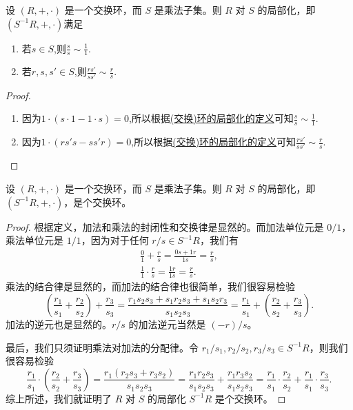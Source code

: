 \documentclass[../../main.tex]{subfiles}
\begin{document}
\begin{proposition}[(交换)环的局部化的基本性质]\label{proposition:(交换)环的局部化的基本性质}
设 $(R, +, \cdot)$ 是一个交换环，而 $S$ 是乘法子集。则 $R$ 对 $S$ 的局部化，即 $(S^{-1}R, +, \cdot)$满足
\begin{enumerate}[(1)]
\item 若$s\in S$,则$\frac{s}{s}\sim \frac{1}{1}.$

\item 若$r,s,s'\in S$,则$\frac{rs'}{ss'}\sim \frac{r}{s}.$
\end{enumerate}
\end{proposition}
\begin{proof}
\begin{enumerate}[(1)]
\item 因为$1\cdot (s\cdot1-1\cdot s)=0$,所以根据\hyperref[definition:(交换)环的局部化]{(交换)环的局部化的定义}可知$\frac{s}{s}\sim \frac{1}{1}.$

\item 因为$1\cdot (rs's-ss'r)=0$,所以根据\hyperref[definition:(交换)环的局部化]{(交换)环的局部化的定义}可知$\frac{rs'}{ss'}\sim \frac{r}{s}.$
\end{enumerate}
\end{proof}

\begin{proposition}[(交换)环的局部化还是交换环]\label{proposition:(交换)环的局部化还是交换环}
设 $(R, +, \cdot)$ 是一个交换环，而 $S$ 是乘法子集。则 $R$ 对 $S$ 的局部化，即 $(S^{-1}R, +, \cdot)$，是个交换环。
\end{proposition}
\begin{proof}
根据定义，加法和乘法的封闭性和交换律是显然的。而加法单位元是 $0/1$，乘法单位元是 $1/1$，因为对于任何 $r/s \in S^{-1}R$，我们有
\begin{gather*}
\frac{0}{1} + \frac{r}{s} = \frac{0s + 1r}{1s} = \frac{r}{s},\\
\frac{1}{1} \cdot \frac{r}{s} = \frac{1r}{1s} = \frac{r}{s}.
\end{gather*}
乘法的结合律是显然的，而加法的结合律也很简单，我们很容易检验
\[
\left(\frac{r_1}{s_1} + \frac{r_2}{s_2}\right) + \frac{r_3}{s_3} = \frac{r_1s_2s_3 + s_1r_2s_3 + s_1s_2r_3}{s_1s_2s_3} = \frac{r_1}{s_1} + \left(\frac{r_2}{s_2} + \frac{r_3}{s_3}\right).
\]
加法的逆元也是显然的。$r/s$ 的加法逆元当然是 $(-r)/s$。

最后，我们只须证明乘法对加法的分配律。令 $r_1/s_1, r_2/s_2, r_3/s_3 \in S^{-1}R$，则我们很容易检验
\[
\frac{r_1}{s_1} \cdot \left(\frac{r_2}{s_2} + \frac{r_3}{s_3}\right) = \frac{r_1(r_2s_3 + r_3s_2)}{s_1s_2s_3} = \frac{r_1r_2s_3}{s_1s_2s_3} + \frac{r_1r_3s_2}{s_1s_2s_3} = \frac{r_1}{s_1} \cdot \frac{r_2}{s_2} + \frac{r_1}{s_1} \cdot \frac{r_3}{s_3}.
\]
综上所述，我们就证明了 $R$ 对 $S$ 的局部化 $S^{-1}R$ 是个交换环。 
\end{proof}
\end{document}
